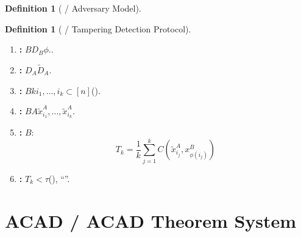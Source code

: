 \documentclass[11pt,a4paper]{article}
\theoremstyle{plain}
\theoremstyle{definition}
\newtheorem{definition}[theorem]{Definition}
\theoremstyle{remark}
\begin{document}
{\begin{definition}[ / Adversary Model]
\end{definition}
\begin{definition}[ / Tampering Detection Protocol]
\label{def:protocol}
\begin{enumerate}[leftmargin=*, label=\textbf{ \arabic*}.]
 \item \textbf{: } $B$$D_B$$\phi$..
 \item \textbf{: } $D_A$$\tilde{D}_A$.
 \item \textbf{: } $B$$k$$i_1, \ldots, i_k \subset [n]$().
 \item \textbf{: } $B$$A$$\tilde{x}_{i_1}^A, \ldots, \tilde{x}_{i_k}^A$.
 \item \textbf{: } $B$: 
 \begin{equation}
 T_k = \frac{1}{k} \sum_{j=1}^{k} C(\tilde{x}_{i_j}^A, x_{\phi(i_j)}^B)
 \end{equation}
 \item \textbf{: } $T_k < \tau$(), ``''.
\end{enumerate}
\end{definition}
\section{ACAD / ACAD Theorem System}
\label{sec:acad-theorems}
}
\end{document}
